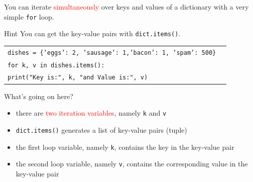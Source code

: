 \documentclass[t,handout,9pt]{beamer}
\begin{document}
\begin{frame}
You can iterate \textcolor{red}{simultaneously} over keys and values of a dictionary with a very simple \texttt{for} loop.
\vfill
\begin{block}{Hint}
You can get the key-value pairs with \texttt{dict.items()}.
\end{block}
\vfill
\begin{table}[]
\begin{flushleft}
\begin{tabular}{ll}
\texttt{dishes = \{'eggs': 2, 'sausage': 1,'bacon': 1, 'spam': 500\}} &   \\
\texttt{for k, v in dishes.items():} &   \\
\texttt{\qquad print("Key is:", k, "and Value is:", v)} &   \\
\end{tabular}
\end{flushleft}
\end{table}
\vfill
What's going on here?
\begin{itemize}
	\item there are \textcolor{red}{two iteration variables}, namely \texttt{k} and \texttt{v}
	\item \texttt{dict.items()} generates a list of key-value pairs (tuple)
	\item the first loop variable, namely \texttt{k}, contains the key in the key-value pair
	\item the second loop variable, namely \texttt{v}, contains the corresponding value in the key-value pair
\end{itemize}
\end{frame}
\end{document}
